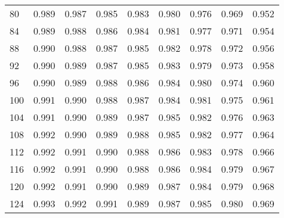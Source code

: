 \begin{table}
\begin{tabular}{lrrrrrrrr}
80  & 0.989 & 0.987 & 0.985 & 0.983 & 0.980 & 0.976 & 0.969 & 0.952 \\
84  & 0.989 & 0.988 & 0.986 & 0.984 & 0.981 & 0.977 & 0.971 & 0.954 \\
88  & 0.990 & 0.988 & 0.987 & 0.985 & 0.982 & 0.978 & 0.972 & 0.956 \\
92  & 0.990 & 0.989 & 0.987 & 0.985 & 0.983 & 0.979 & 0.973 & 0.958 \\
96  & 0.990 & 0.989 & 0.988 & 0.986 & 0.984 & 0.980 & 0.974 & 0.960 \\
100 & 0.991 & 0.990 & 0.988 & 0.987 & 0.984 & 0.981 & 0.975 & 0.961 \\
104 & 0.991 & 0.990 & 0.989 & 0.987 & 0.985 & 0.982 & 0.976 & 0.963 \\
108 & 0.992 & 0.990 & 0.989 & 0.988 & 0.985 & 0.982 & 0.977 & 0.964 \\
112 & 0.992 & 0.991 & 0.990 & 0.988 & 0.986 & 0.983 & 0.978 & 0.966 \\
116 & 0.992 & 0.991 & 0.990 & 0.988 & 0.986 & 0.984 & 0.979 & 0.967 \\
120 & 0.992 & 0.991 & 0.990 & 0.989 & 0.987 & 0.984 & 0.979 & 0.968 \\
124 & 0.993 & 0.992 & 0.991 & 0.989 & 0.987 & 0.985 & 0.980 & 0.969 \\
\bottomrule
\end{tabular}
\end{table}
